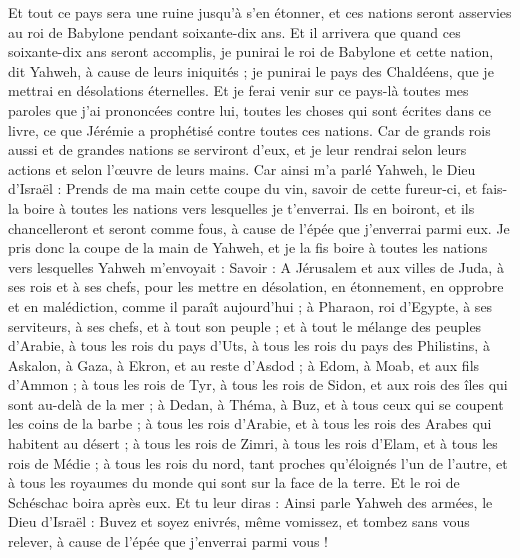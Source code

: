 \begin{multicols}{2}
Et tout ce pays sera une ruine jusqu'à s'en étonner, et ces nations seront asservies au roi de Babylone pendant soixante-dix ans.
Et il arrivera que quand ces soixante-dix ans seront accomplis, je punirai le roi de Babylone et cette nation, dit Yahweh, à cause de leurs iniquités ; je punirai le pays des Chaldéens, que je mettrai en désolations éternelles.
Et je ferai venir sur ce pays-là toutes mes paroles que j'ai prononcées contre lui, toutes les choses qui sont écrites dans ce livre, ce que Jérémie a prophétisé contre toutes ces nations.
Car de grands rois aussi et de grandes nations se serviront d'eux, et je leur rendrai selon leurs actions et selon l'œuvre de leurs mains.
Car ainsi m'a parlé Yahweh, le Dieu d'Israël : Prends de ma main cette coupe du vin, savoir de cette fureur-ci, et fais-la boire à toutes les nations vers lesquelles je t'enverrai.
Ils en boiront, et ils chancelleront et seront comme fous, à cause de l'épée que j'enverrai parmi eux.
Je pris donc la coupe de la main de Yahweh, et je la fis boire à toutes les nations vers lesquelles Yahweh m'envoyait :
Savoir : A Jérusalem et aux villes de Juda, à ses rois et à ses chefs, pour les mettre en désolation, en étonnement, en opprobre et en malédiction, comme il paraît aujourd'hui ;
à Pharaon, roi d'Egypte, à ses serviteurs, à ses chefs, et à tout son peuple ;
et à tout le mélange des peuples d'Arabie, à tous les rois du pays d'Uts, à tous les rois du pays des Philistins, à Askalon, à Gaza, à Ekron, et au reste d'Asdod ;
à Edom, à Moab, et aux fils d'Ammon ;
à tous les rois de Tyr, à tous les rois de Sidon, et aux rois des îles qui sont au-delà de la mer ;
à Dedan, à Théma, à Buz, et à tous ceux qui se coupent les coins de la barbe ;
à tous les rois d'Arabie, et à tous les rois des Arabes qui habitent au désert ;
à tous les rois de Zimri, à tous les rois d'Elam, et à tous les rois de Médie ;
à tous les rois du nord, tant proches qu'éloignés l'un de l'autre, et à tous les royaumes du monde qui sont sur la face de la terre. Et le roi de Schéschac boira après eux.
Et tu leur diras : Ainsi parle Yahweh des armées, le Dieu d'Israël : Buvez et soyez enivrés, même vomissez, et tombez sans vous relever, à cause de l'épée que j'enverrai parmi vous !

\end{multicols}
